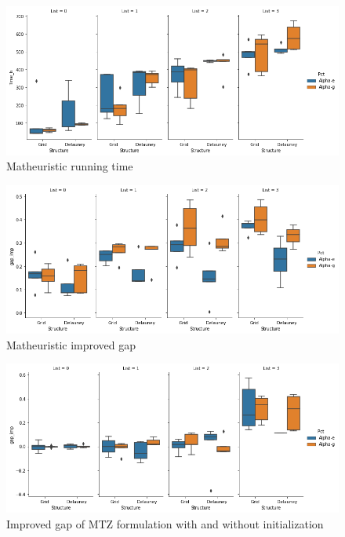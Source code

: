 \documentclass[slidestop,usepdftitle=false,10pt]{beamer}
\begin{document}
	\begin{frame}
	    \begin{figure}
	        \centering
            \includegraphics[width=1\linewidth]{time_h.png}
            \caption{Matheuristic running time}
            \label{fig:1}
	    \end{figure}
	\end{frame}
	\begin{frame}
	    \begin{figure}
    	    \centering
            \includegraphics[width=1\linewidth]{improved_gap.png}
            \caption{Matheuristic improved gap}
	    \end{figure}
	\end{frame}
	\begin{frame}
	    \begin{figure}
            \centering
            \includegraphics[width=1\linewidth]{differencewithwithout.png}
            \caption{Improved gap of MTZ formulation with and without initialization}
            \label{fig:3}
        \end{figure}
	\end{frame}
	
\end{document}
